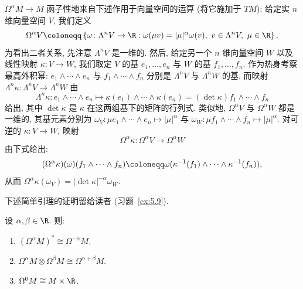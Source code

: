 \begin{remark}[密度丛的函子性视角]\label{rem:5.11}
$\Omega^\alpha M \to M$ 函子性地来自下述作用于向量空间的运算 (将它施加于 $TM$): 给定实 $n$ 维向量空间 $V$, 我们定义
\begin{equation}\label{eq:5.32}
    \Omega^\alpha V \defeq \left\{ \omega \colon \Lambda^n V \to \R : \omega(\mu v) = |\mu|^\alpha \omega(v), \ v \in \Lambda^n V, \ \mu \in \R \right\}.
\end{equation}
为看出二者关系, 先注意 $\Lambda^n V$ 是一维的. 然后, 给定另一个 $n$ 维向量空间 $W$ 以及线性映射 $\kappa \colon V \to W$, 我们取定 $V$ 的基 $e_1, \ldots, e_n$ 与 $W$ 的基 $f_1, \ldots, f_n$. 作为热身考察最高外积幂: $e_1 \wedge \cdots \wedge e_n$ 与 $f_1 \wedge \cdots \wedge f_n$ 分别是 $\Lambda^n V$ 与 $\Lambda^n W$ 的基, 而映射 $\Lambda^n \kappa \colon \Lambda^n V \to \Lambda^n W$ 由
\begin{equation}\label{eq:5.33}
    \Lambda^n \kappa \colon e_1 \wedge \cdots \wedge e_n \mapsto \kappa(e_1) \wedge \cdots \wedge \kappa(e_n) = (\det \kappa) f_1 \wedge \cdots \wedge f_n
\end{equation}
给出, 其中 $\det \kappa$ 是 $\kappa$ 在这两组基下的矩阵的行列式. 类似地, $\Omega^\alpha V$ 与 $\Omega^\alpha W$ 都是一维的, 其基元素分别为 $\omega_V \colon \mu e_1 \wedge \cdots \wedge e_n \mapsto |\mu|^\alpha$ 与 $\omega_W \colon \mu f_1 \wedge \cdots \wedge f_n \mapsto |\mu|^\alpha$. 对可逆的 $\kappa \colon V \to W$, 映射
\begin{equation}\label{eq:5.34}
    \Omega^\alpha \kappa \colon \Omega^\alpha V \to \Omega^\alpha W
\end{equation}
由下式给出:
\begin{equation}\label{eq:5.35}
    (\Omega^\alpha \kappa)(\omega)(f_1 \wedge \cdots \wedge f_n) \defeq \omega(\kappa^{-1}(f_1) \wedge \cdots \wedge \kappa^{-1}(f_n)),
\end{equation}
从而 $\Omega^\alpha \kappa(\omega_V) = |\!\det\kappa|^{-\alpha} \omega_W$.
\end{remark}

下述简单引理的证明留给读者 (习题~\ref{ex:5.9}).

\begin{lemma}[密度丛的性质]\label{lem:5.12}
设 $\alpha, \beta \in \R$. 则:
\begin{enumerate}
    \item $(\Omega^\alpha M)^* \cong \Omega^{-\alpha} M$.
    \item $\Omega^\alpha M \otimes \Omega^\beta M \cong \Omega^{\alpha+\beta} M$.
    \item $\Omega^0 M \cong M \times \R$.
\end{enumerate}
\end{lemma}

